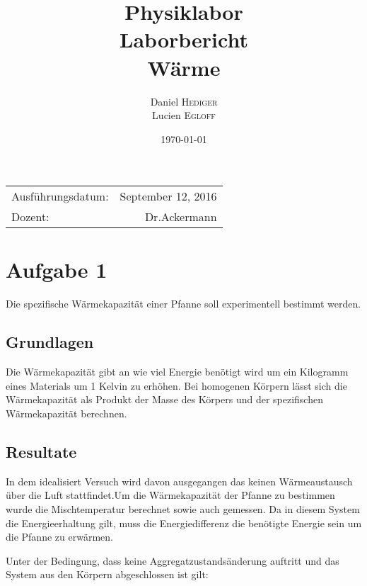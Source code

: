 \documentclass{article}
\title{Physiklabor \\ Laborbericht \\ Wärme} %
\author{Daniel \textsc{Hediger} \\ Lucien \textsc{Egloff}} %
\date{\today} %
\begin{document}
\maketitle %

\begin{center}
\begin{tabular}{l r}
Ausführungsdatum: & September 12, 2016 \\ %
Dozent: & Dr.Ackermann %

\end{tabular}
\end{center}
\newpage
\tableofcontents 

\newpage
\section{Aufgabe 1}
Die spezifische Wärmekapazität einer Pfanne soll experimentell bestimmt werden.
\subsection{Grundlagen}
Die Wärmekapazität gibt an wie viel Energie benötigt wird um ein Kilogramm eines Materials um 1 Kelvin zu erhöhen.
Bei homogenen Körpern lässt sich die Wärmekapazität als Produkt der Masse des Körpers und der spezifischen Wärmekapazität berechnen.
\subsection{Resultate}
In dem idealisiert Versuch wird davon ausgegangen das keinen Wärmeaustausch über die Luft stattfindet.Um die Wärmekapazität der Pfanne zu bestimmen wurde die Mischtemperatur berechnet sowie auch gemessen. Da in diesem System die Energieerhaltung gilt, muss die Energiedifferenz die benötigte Energie sein um die Pfanne zu erwärmen.

Unter der Bedingung, dass keine Aggregatzustandsänderung auftritt und das System aus den Körpern abgeschlossen ist gilt:
\end{document}
